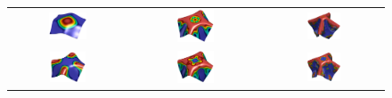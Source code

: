 \begin{figure}[hbtp!]
	\centering
	\begin{tabular}{ccc}
		\includegraphics[width=0.34\textwidth]{Figures/Example2/Pressure/Paraview100v2} &
		\includegraphics[width=0.30\textwidth]{Figures/Example2/Pressure/Paraview220v2} &
		\includegraphics[width=0.30\textwidth]{Figures/Example2/Pressure/Paraview550v2} \\
 		\includegraphics[width=0.33\textwidth]{Figures/Example2/Pressure/Paraview180v2} &
		\includegraphics[width=0.30\textwidth]{Figures/Example2/Pressure/Paraview250v2} &
\includegraphics[width=0.30\textwidth]{Figures/Example2/Pressure/Paraview570v2} \\

\end{tabular}
\end{figure}
